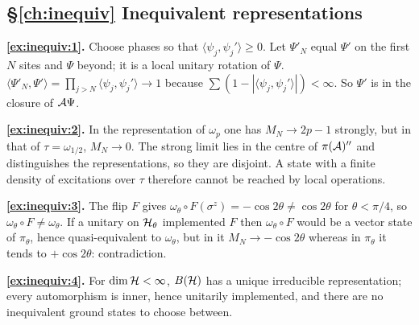 {\subsection*{\S\ref{ch:inequiv} Inequivalent representations}
\textbf{\ref{ex:inequiv:1}.} Choose phases so that $\langle\psi_j,\psi_j'\rangle\ge0$. Let $\Psi'_N$ equal $\Psi'$ on the first $N$ sites and $\Psi$ beyond; it is a local unitary rotation of $\Psi$. $\langle\Psi'_N,\Psi'\rangle=\prod_{j>N}\langle\psi_j,\psi_j'\rangle\to1$ because $\sum(1-|\langle\psi_j,\psi_j'\rangle|)<\infty$. So $\Psi'$ is in the closure of $\mathcal{A}\Psi$.\par
\textbf{\ref{ex:inequiv:2}.} In the representation of $\omega_p$ one has $M_N\to2p-1$ strongly, but in that of $\tau=\omega_{1/2}$, $M_N\to0$. The strong limit lies in the centre of $\pi(\mathcal{A})''$ and distinguishes the representations, so they are disjoint. A state with a finite density of excitations over $\tau$ therefore cannot be reached by local operations.\par
\textbf{\ref{ex:inequiv:3}.} The flip $F$ gives $\omega_\theta\circ F(\sigma^z)=-\cos2\theta\ne\cos2\theta$ for $\theta<\pi/4$, so $\omega_\theta\circ F\ne\omega_\theta$. If a unitary on $\mathcal{H}_\theta$ implemented $F$ then $\omega_\theta\circ F$ would be a vector state of $\pi_\theta$, hence quasi-equivalent to $\omega_\theta$, but in it $M_N\to-\cos2\theta$ whereas in $\pi_\theta$ it tends to $+\cos2\theta$: contradiction.\par
\textbf{\ref{ex:inequiv:4}.} For $\dim\mathcal{H}<\infty$, $B(\mathcal{H})$ has a unique irreducible representation; every automorphism is inner, hence unitarily implemented, and there are no inequivalent ground states to choose between.\par

}
